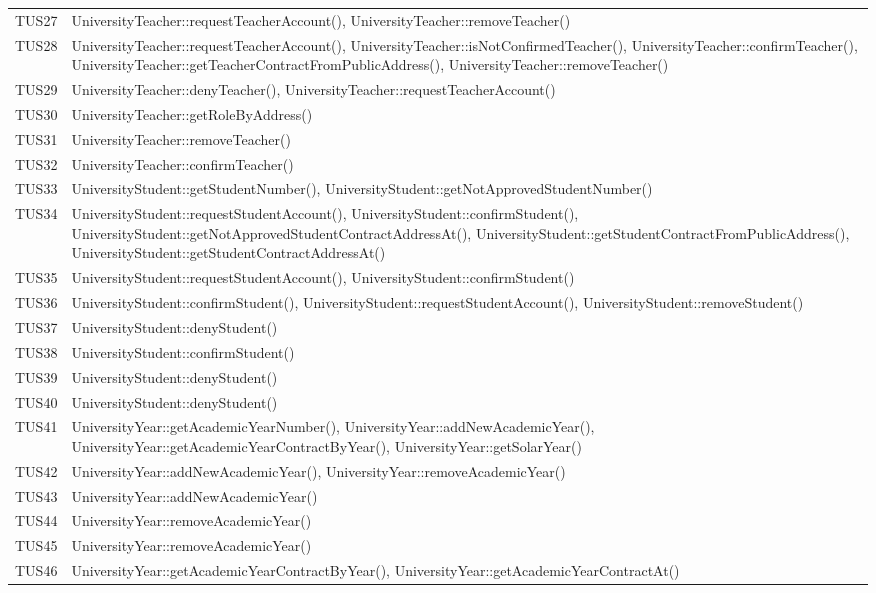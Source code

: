 \documentclass[PianoDiQualifica.tex]{subfiles}
\begin{document}
\begin{longtable}[H]{P{5cm}P{9cm}}
	TUS27 & UniversityTeacher::requestTeacherAccount(), UniversityTeacher::removeTeacher() \\
	TUS28 & UniversityTeacher::requestTeacherAccount(), UniversityTeacher::isNotConfirmedTeacher(), UniversityTeacher::confirmTeacher(), UniversityTeacher::getTeacherContractFromPublicAddress(), UniversityTeacher::removeTeacher() \\
	TUS29 & UniversityTeacher::denyTeacher(), UniversityTeacher::requestTeacherAccount() \\
	TUS30 & UniversityTeacher::getRoleByAddress() \\
	TUS31 & UniversityTeacher::removeTeacher() \\
	TUS32 & UniversityTeacher::confirmTeacher() \\
	TUS33 & UniversityStudent::getStudentNumber(), UniversityStudent::getNotApprovedStudentNumber() \\
	TUS34 & UniversityStudent::requestStudentAccount(), UniversityStudent::confirmStudent(), UniversityStudent::getNotApprovedStudentContractAddressAt(), UniversityStudent::getStudentContractFromPublicAddress(), UniversityStudent::getStudentContractAddressAt()
	\\
	TUS35 & UniversityStudent::requestStudentAccount(), UniversityStudent::confirmStudent()  \\
	TUS36 & UniversityStudent::confirmStudent(), UniversityStudent::requestStudentAccount(), UniversityStudent::removeStudent()  \\
	TUS37 & UniversityStudent::denyStudent() \\
	TUS38 & UniversityStudent::confirmStudent() \\
	TUS39 & UniversityStudent::denyStudent() \\
	TUS40 & UniversityStudent::denyStudent() \\
	TUS41 & UniversityYear::getAcademicYearNumber(), UniversityYear::addNewAcademicYear(), UniversityYear::getAcademicYearContractByYear(), UniversityYear::getSolarYear()\\
	TUS42 & UniversityYear::addNewAcademicYear(), UniversityYear::removeAcademicYear() \\
	TUS43 & UniversityYear::addNewAcademicYear()\\
	TUS44 & UniversityYear::removeAcademicYear()\\
	TUS45 & UniversityYear::removeAcademicYear()\\
	TUS46 & UniversityYear::getAcademicYearContractByYear(), UniversityYear::getAcademicYearContractAt()\\

\end{longtable}
\end{document}
